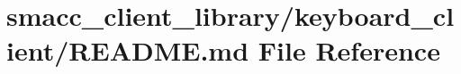 \hypertarget{smacc__client__library_2keyboard__client_2README_8md}{}\section{smacc\+\_\+client\+\_\+library/keyboard\+\_\+client/\+R\+E\+A\+D\+ME.md File Reference}
\label{smacc__client__library_2keyboard__client_2README_8md}
